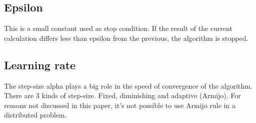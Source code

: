 \documentclass[a4paper,11pt,oneside]{book}
\begin{document}
\subsection{Epsilon} \label{Subsec2.2.2}
This is a small constant used as stop condition. If the result of the current calculation differs less than epsilon from the previous, the algorithm is stopped.

\subsection{Learning rate} \label{Subsec2.2.3}
The step-size alpha plays a big role in the speed of convergence of the algorithm. There are 3 kinds of step-size. Fixed, diminishing and adaptive (Armijo). For reasons not discussed in this paper, it's not possible to use Armijo rule in a distributed problem.
\end{document}
